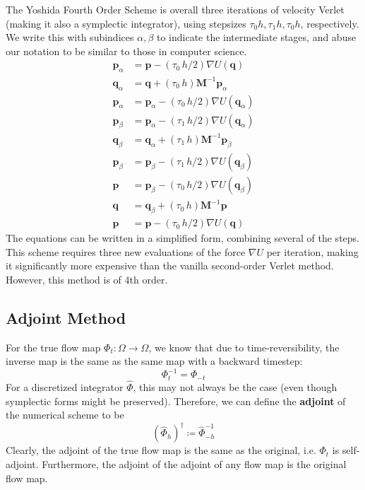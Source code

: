       The Yoshida Fourth Order Scheme is overall three iterations of velocity Verlet (making it also a symplectic integrator), using stepsizes $\tau_0 h, \tau_1 h, \tau_0 h$, respectively. We write this with subindices $\alpha, \beta$ to indicate the intermediate stages, and abuse our notation to be similar to those in computer science. 
      \begin{align*}
        \mathbf{p}_\alpha & = \mathbf{p} - (\tau_0\, h/2) \nabla U(\mathbf{q}) \\
        \mathbf{q}_\alpha & = \mathbf{q} + (\tau_0 \, h) \mathbf{M}^{-1} \mathbf{p}_\alpha \\
        \mathbf{p}_\alpha & = \mathbf{p}_\alpha - (\tau_0 \, h / 2) \nabla U(\mathbf{q}_\alpha) \\
        \mathbf{p}_\beta & = \mathbf{p}_\alpha - (\tau_1 \, h/2) \nabla U(\mathbf{q}_\alpha) \\
        \mathbf{q}_\beta & = \mathbf{q}_\alpha + (\tau_1 \, h) \mathbf{M}^{-1} \mathbf{p}_\beta \\
        \mathbf{p}_\beta & = \mathbf{p}_\beta - (\tau_1 \, h/2) \nabla U(\mathbf{q}_\beta) \\
        \mathbf{p} & = \mathbf{p}_\beta - (\tau_0 \, h/2) \nabla U(\mathbf{q}_\beta) \\
        \mathbf{q} & = \mathbf{q}_\beta + (\tau_0 \, h) \mathbf{M}^{-1} \mathbf{p} \\
        \mathbf{p} & = \mathbf{p} - (\tau_0 \, h/2) \nabla U(\mathbf{q}) 
      \end{align*}
      The equations can be written in a simplified form, combining several of the steps. This scheme requires three new evaluations of the force $\nabla U$ per iteration, making it significantly more expensive than the vanilla second-order Verlet method. However, this method is of 4th order. 

  \subsection{Adjoint Method}

    For the true flow map $\Phi_t: \Omega \to \Omega$, we know that due to time-reversibility, the inverse map is the same as the same map with a backward timestep: 
    \begin{equation}
      \Phi_t^{-1} = \Phi_{-t}
    \end{equation}
    For a discretized integrator $\hat{\Phi}$, this may not always be the case (even though symplectic forms might be preserved). Therefore, we can define the \textbf{adjoint} of the numerical scheme to be 
    \begin{equation}
      (\hat{\Phi}_{h})^\dagger \coloneqq \hat{\Phi}_{-h}^{-1}
    \end{equation}
    Clearly, the adjoint of the true flow map is the same as the original, i.e. $\Phi_t$ is self-adjoint. Furthermore, the adjoint of the adjoint of any flow map is the original flow map. 

